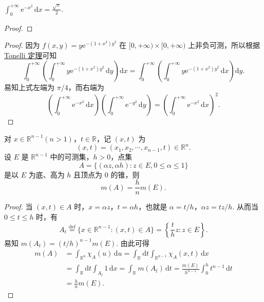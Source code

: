 \documentclass[../../main.tex]{subfiles}%
\begin{document}
\begin{example}
$\int_0^{+\infty} \mathrm{e}^{-x^2} \, \mathrm{d}x = \frac{\sqrt{\pi}}{2}.$
\end{example}
\begin{proof}



\end{proof}
\begin{proof}

因为 \( f(x, y) = y \mathrm{e}^{-(1 + x^2)y^2} \) 在 \( [0, +\infty) \times [0, +\infty) \) 上非负可测，所以根据\hyperref[theorem:Tonelli 定理 非负可测函数的情形]{Tonelli 定理}可知
\[
\int_0^{+\infty} \left( \int_0^{+\infty} y \mathrm{e}^{-(1 + x^2)y^2} \, \mathrm{d}y \right) \mathrm{d}x = \int_0^{+\infty} \left( \int_0^{+\infty} y \mathrm{e}^{-(1 + x^2)y^2} \, \mathrm{d}x \right) \mathrm{d}y.
\]
易知上式左端为 \( \pi/4 \)，而右端为
\[
\left( \int_0^{+\infty} \mathrm{e}^{-x^2} \, \mathrm{d}x \right) \left( \int_0^{+\infty} \mathrm{e}^{-y^2} \, \mathrm{d}y \right) = \left( \int_0^{+\infty} \mathrm{e}^{-x^2} \, \mathrm{d}x \right)^2.
\]

\end{proof}

\begin{example}
对 \( x \in \mathbb{R}^{n - 1} (n > 1) \)，\( t \in \mathbb{R} \)，记 \( (x, t) \) 为
\[
(x, t) = (x_1, x_2, \cdots, x_{n - 1}, t) \in \mathbb{R}^n.
\]
设 \( E \) 是 \( \mathbb{R}^{n - 1} \) 中的可测集，\( h > 0 \)，点集
\[
A = \{ (\alpha z, \alpha h) : z \in E, 0 \leqslant \alpha \leqslant 1 \}
\]
是以 \( E \) 为底、高为 \( h \) 且顶点为 0 的锥，则
\[
m(A) = \frac{h}{n} m(E).
\]
\end{example}
\begin{proof}

当 \( (x, t) \in A \) 时，\( x = \alpha z \)，\( t = \alpha h \)，也就是 \( \alpha = t/h \)，\( \alpha z = t z / h \). 从而当 \( 0 \leqslant t \leqslant h \) 时，有
\[
A_t \stackrel{\text{def}}{=} \{ x \in \mathbb{R}^{n - 1} : (x, t) \in A \} = \left\{ \frac{t}{h} z : z \in E \right\}.
\]
易知 \( m(A_t) = (t/h)^{n - 1} m(E) \). 由此可得
\begin{align*}
m(A) &= \int_{\mathbb{R}^n} \chi_A(u) \, \mathrm{d}u = \int_{\mathbb{R}} \mathrm{d}t \int_{\mathbb{R}^{n - 1}} \chi_A(x, t) \, \mathrm{d}x \\
&= \int_{\mathbb{R}} \mathrm{d}t \int_{A_t} 1 \, \mathrm{d}x = \int_{\mathbb{R}} m(A_t) \, \mathrm{d}t = \frac{m(E)}{h^{n - 1}} \int_0^h t^{n - 1} \, \mathrm{d}t \\
&= \frac{h}{n} m(E).
\end{align*}

\end{proof}
\end{document}
